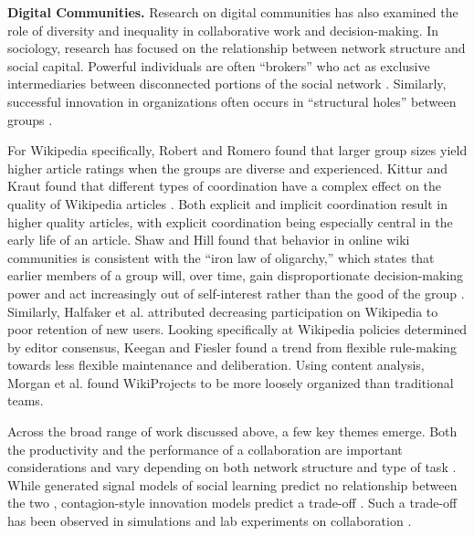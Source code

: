 {\bf Digital Communities.}
Research on digital communities has also examined the role of 
diversity and inequality
in collaborative work and decision-making.
In sociology, research has focused on the relationship between
network structure and social capital.
Powerful individuals are often ``brokers''
who act as exclusive intermediaries between disconnected portions of the
social network \cite{silverman_patronage_1965}.
Similarly, successful innovation in organizations often occurs in ``structural
holes'' between groups \cite{granovetter_strength_1973}.

For Wikipedia specifically,
Robert and Romero \cite{robert_crowd_2015} found that
larger group sizes yield higher article ratings
when the groups are diverse and experienced. Kittur and Kraut found that different types of coordination have a complex
effect on the quality of Wikipedia articles \cite{kittur_harnessing_2008}.
Both explicit and implicit coordination result in higher quality articles,
with explicit coordination being especially central in the early life of an
article.
Shaw and Hill \cite{shaw_laboratories_2014}
found that behavior in online wiki communities is consistent
with the ``iron law of oligarchy,''
which states that
earlier members of a group will, over time, gain disproportionate
decision-making power and act increasingly out of self-interest rather than
the good of the group \cite{michels_political_1999}.
Similarly, Halfaker et al. \cite{halfaker_rise_2013} attributed decreasing
participation on Wikipedia to poor retention of new users.
Looking specifically at Wikipedia policies determined by editor consensus,
Keegan and Fiesler \cite{keegan_evolution_2017} found a trend
from flexible rule-making towards less flexible maintenance and deliberation.
Using content analysis,
Morgan et al. \cite{morgan_project_2013} found WikiProjects to be
more loosely organized than traditional teams.

Across the broad range of work discussed above,
a few key themes emerge.
Both the productivity and the performance of a collaboration are important
considerations and vary depending on both network structure and type of task
\cite{kearns_experiments_2012}.
While generated signal models of social learning predict no relationship
between the two
\cite{golub_naive_2010},
contagion-style innovation models predict a trade-off
\cite{mason_collaborative_2012,barkoczi_social_2016}.
Such a trade-off has been observed in simulations and lab experiments on
collaboration
\cite{kearns_experiments_2012,grim_scientific_2013}.

